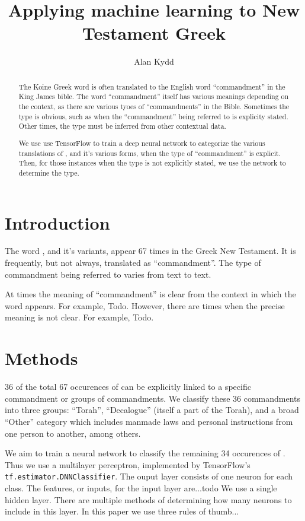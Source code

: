 \documentclass{article}
\title{Applying machine learning to New Testament Greek}
\author{Alan Kydd}
\newcommand{\entole}{\textepsilon\textnu\texttau\textomikron\textlambda\textepsilon\xspace}
\begin{document}
\maketitle

\begin{abstract}
The Koine Greek word \entole is often translated to the English
word ``commandment'' in the King James bible.  The word ``commandment'' itself
has various meanings depending on the context, as there are various tyoes of
``commandments'' in the Bible.  Sometimes the type
is obvious, such as when the ``commandment'' being referred to is explicity
stated.  Other times, the type must be inferred from other contextual
data.

We use use TensorFlow to train a deep neural
network to categorize the various translations of \entole,
and it's various forms, when the type of ``commandment'' is explicit. 
Then, for those instances when the type is not explicitly stated,  we use the network 
to determine the type.
\end{abstract}

\section{Introduction}
The word \entole, and it's variants, appear 67 times in the Greek New 
Testament.  It is frequently, but not always, translated as
``commandment''.  The type of commandment being referred to varies from text to 
text.

At times the meaning of ``commandment'' is clear from the context in which
the word appears.  For example, Todo.  However, there are times when the precise
meaning is not clear.  For example, Todo.  

\section{Methods}
36 of the total 67 occurences of \entole can be explicitly linked to a specific
commandment or groups of commandments.
We classify these 36 commandments into three groups: ``Torah'', ``Decalogue'' (itself a part
of the Torah), and a broad ``Other'' category which includes manmade laws
and personal instructions from one person to another, among others.

We aim to train a neural network to classify the remaining 34 occurences of \entole.  Thus
we use a multilayer perceptron, implemented by TensorFlow's \texttt{tf.estimator.DNNClassifier}.
The ouput layer consists of one neuron for each class.
The features, or inputs, for the input layer are...todo
We use a single hidden layer.  There are multiple methods of determining how many neurons
to include in this layer.  In this paper we use three rules of thumb...
\end{document}
